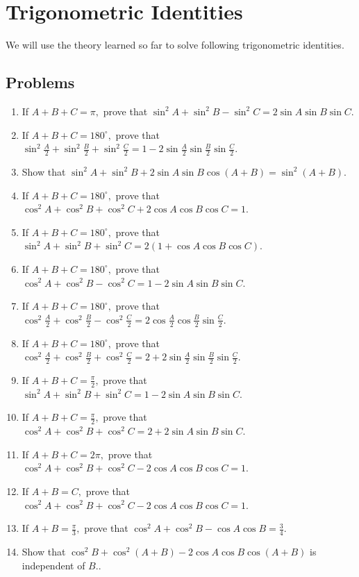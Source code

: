 \chapter{Trigonometric Identities}
We will use the theory learned so far to solve following trigonometric identities.

\section{Problems}
\begin{enumerate}
\item If $A + B + C = \pi,$ prove that $\sin^2A + \sin^2B - \sin^2C = 2\sin A\sin B\sin C$.
\item If $A + B + C = 180^\circ,$ prove that $\sin^2\frac{A}{2} + \sin^2\frac{B}{2} + \sin^2\frac{C}{2} = 1 - 2\sin
  \frac{A}{2}\sin \frac{B}{2}\sin \frac{C}{2}$.
\item Show that $\sin^2A + \sin^2B + 2\sin A\sin B\cos(A + B) = \sin^2(A + B)$.
\item If $A + B + C = 180^\circ,$ prove that $\cos^2A + \cos^2B + \cos^2C + 2\cos A\cos B\cos C = 1$.
\item If $A + B + C = 180^\circ,$ prove that $\sin^2A + \sin^2B + \sin^2C = 2(1 + \cos A \cos B \cos C)$.
\item If $A + B + C = 180^\circ,$ prove that $\cos^2A + \cos^2B - \cos^2C = 1 - 2\sin A\sin B\sin C$.
\item If $A + B + C = 180^\circ,$ prove that $\cos^2\frac{A}{2} + \cos^2\frac{B}{2} - \cos^2\frac{C}{2} =
  2\cos\frac{A}{2}\cos\frac{B}{2}\sin\frac{C}{2}$.
\item If $A + B + C = 180^\circ,$ prove that $\cos^2\frac{A}{2} + \cos^2\frac{B}{2} + \cos^2\frac{C}{2} = 2 +
  2\sin\frac{A}{2}\sin\frac{B}{2}\sin\frac{C}{2}$.
\item If $A + B + C = \frac{\pi}{2},$ prove that $\sin^2A + \sin^2B + \sin^2C = 1 - 2\sin A\sin B\sin C$.
\item If $A + B + C = \frac{\pi}{2},$ prove that $\cos^2A + \cos^2B + \cos^2C = 2 + 2\sin A\sin B\sin C$.
\item If $A + B + C = 2\pi,$ prove that $\cos^2A + \cos^2B + \cos^2C - 2\cos A\cos B\cos C = 1$.
\item If $A + B = C,$ prove that $\cos^2A + \cos^2B + \cos^2C - 2\cos A\cos B\cos C = 1$.
\item If $A + B = \frac{\pi}{3},$ prove that $\cos^2A + \cos^2B - \cos A\cos B = \frac{3}{4}$.
\item Show that $\cos^2B + \cos^2(A + B) - 2\cos A\cos B\cos(A + B)$ is independent of $B.$.

\end{enumerate}
